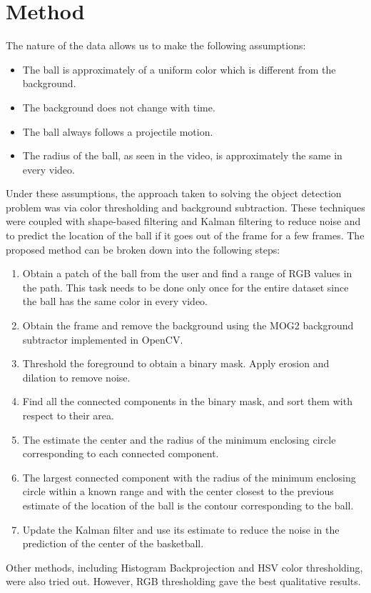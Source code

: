 \documentclass[12pt]{article}
\begin{document}
\section*{Method}
The nature of the data allows us to make the following assumptions:
\begin{itemize}
  \item The ball is approximately of a uniform color which is different from the background.
  \item The background does not change with time.
  \item The ball always follows a projectile motion.
  \item The radius of the ball, as seen in the video, is approximately the same in every video.
\end{itemize}
Under these assumptions, the approach taken to solving the object detection problem was via color thresholding and background subtraction. These techniques were coupled with shape-based filtering and Kalman filtering to reduce noise and to predict the location of the ball if it goes out of the frame for a few frames. The proposed method can be broken down into the following steps:
\begin{enumerate}
  \item Obtain a patch of the ball from the user and find a range of RGB values in the path. This task needs to be done only once for the entire dataset since the ball has the same color in every video.
  \item Obtain the frame and remove the background using the MOG2 background subtractor implemented in OpenCV.
  \item Threshold the foreground to obtain a binary mask. Apply erosion and dilation to remove noise.
  \item Find all the connected components in the binary mask, and sort them with respect to their area.
  \item The estimate the center and the radius of the minimum enclosing circle corresponding to each connected component.
  \item The largest connected component with the radius of the minimum enclosing circle within a known range and with the center closest to the previous estimate of the location of the ball is the contour corresponding to the ball.
  \item Update the Kalman filter and use its estimate to reduce the noise in the prediction of the center of the basketball.
\end{enumerate}
Other methods, including Histogram Backprojection and HSV color thresholding, were also tried out. However, RGB thresholding gave the best qualitative results.
\end{document}
